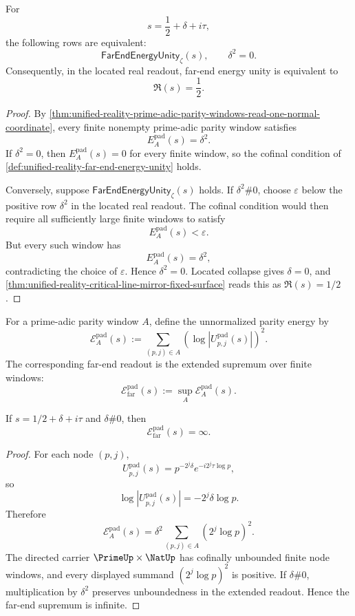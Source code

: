 \begin{theorem}
\label{thm:unified-reality-far-end-energy-unity-fixed-half-energy}
For
$$
s=\frac12+\delta+i\tau,
$$
the following rows are equivalent:
$$
\mathsf{FarEndEnergyUnity}_{\zeta}(s),
\qquad
\delta^2=0.
$$
Consequently, in the located real readout, far-end energy unity is
equivalent to
$$
\Re(s)=\frac12.
$$
\end{theorem}

\begin{proof}
By
\autoref{thm:unified-reality-prime-adic-parity-windows-read-one-normal-coordinate},
every finite nonempty prime-adic parity window satisfies
$$
E_A^{\mathrm{pad}}(s)=\delta^2.
$$
If $\delta^2=0$, then $E_A^{\mathrm{pad}}(s)=0$ for every finite
window, so the cofinal condition of
\autoref{def:unified-reality-far-end-energy-unity} holds.

Conversely, suppose
$\mathsf{FarEndEnergyUnity}_{\zeta}(s)$ holds.  If
$\delta^2\#0$, choose $\varepsilon$ below the positive row
$\delta^2$ in the located real readout.  The cofinal condition would
then require all sufficiently large finite windows to satisfy
$$
E_A^{\mathrm{pad}}(s)<\varepsilon.
$$
But every such window has
$$
E_A^{\mathrm{pad}}(s)=\delta^2,
$$
contradicting the choice of $\varepsilon$.  Hence $\delta^2=0$.
Located collapse gives $\delta=0$, and
\autoref{thm:unified-reality-critical-line-mirror-fixed-surface} reads
this as $\Re(s)=1/2$.
\end{proof}

\begin{definition}
\label{def:unified-reality-unnormalized-parity-far-end-energy}
For a prime-adic parity window $A$, define the unnormalized parity energy
by
$$
\mathcal E_A^{\mathrm{pad}}(s)
:=
\sum_{(p,j)\in A}
\left(\log\left|U_{p,j}^{\mathrm{pad}}(s)\right|\right)^2.
$$
The corresponding far-end readout is the extended supremum over finite
windows:
$$
\mathcal E_{\mathrm{far}}^{\mathrm{pad}}(s)
:=
\sup_{A}
\mathcal E_A^{\mathrm{pad}}(s).
$$
\end{definition}

\begin{theorem}
\label{thm:unified-reality-unnormalized-parity-energy-diverges-off-half}
If $s=1/2+\delta+i\tau$ and $\delta\#0$, then
$$
\mathcal E_{\mathrm{far}}^{\mathrm{pad}}(s)=\infty.
$$
\end{theorem}

\begin{proof}
For each node $(p,j)$,
$$
U_{p,j}^{\mathrm{pad}}(s)
=
p^{-2^j\delta}e^{-i2^j\tau\log p},
$$
so
$$
\log\left|U_{p,j}^{\mathrm{pad}}(s)\right|
=
-2^j\delta\log p.
$$
Therefore
$$
\mathcal E_A^{\mathrm{pad}}(s)
=
\delta^2
\sum_{(p,j)\in A}
\left(2^j\log p\right)^2.
$$
The directed carrier $\PrimeUp\times\NatUp$ has cofinally unbounded
finite node windows, and every displayed summand
$\left(2^j\log p\right)^2$ is positive.  If $\delta\#0$, multiplication
by $\delta^2$ preserves unboundedness in the extended readout.  Hence the
far-end supremum is infinite.
\end{proof}


